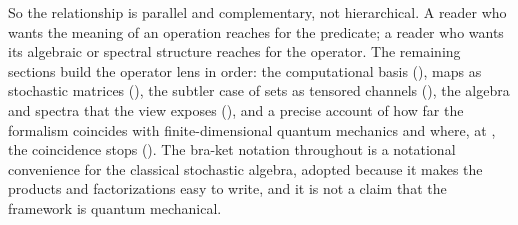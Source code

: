 So the relationship is parallel and complementary, not hierarchical. A reader
who wants the meaning of an operation reaches for the predicate; a reader who
wants its algebraic or spectral structure reaches for the operator. The
remaining sections build the operator lens in order: the computational basis
(), maps as stochastic matrices
(), the subtler case of sets as tensored
channels (), the algebra and spectra that the
view exposes (), and a precise account
of how far the formalism coincides with finite-dimensional quantum mechanics
and where, at , the coincidence stops
(). The bra-ket notation throughout is a
notational convenience for the classical stochastic algebra, adopted because it
makes the products and factorizations easy to write, and it is not a claim that
the framework is quantum mechanical.
